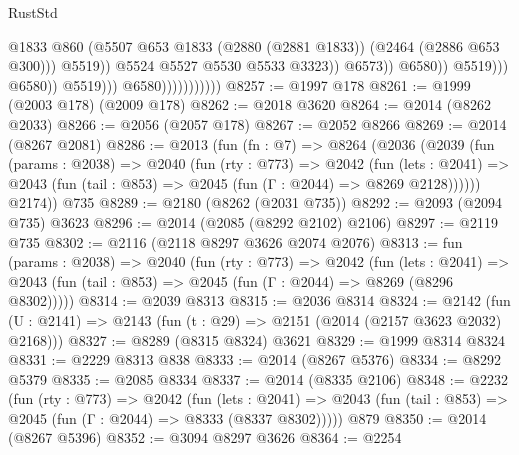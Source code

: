 \begin{lexlean}{RustStd}
\begin{coremodule}
                                                          @1833
                                                          @860
                                                          (@5507
                                                            @653
                                                            @1833
                                                            (@2880 (@2881 @1833))
                                                            (@2464 (@2886 @653 @300)))
                                                          @5519))
                                                      @5524
                                                      @5527
                                                      @5530
                                                      @5533
                                                      @3323))
                                                  @6573))
                                              @6580))
                                          @5519)))
                                    @6580))
                                @5519)))
                          @6580)))))))))))
@8257 := @1997 @178
@8261 := @1999 (@2003 @178) (@2009 @178)
@8262 := @2018 @3620
@8264 := @2014 (@8262 @2033)
@8266 := @2056 (@2057 @178)
@8267 := @2052 @8266
@8269 := @2014 (@8267 @2081)
@8286 := @2013
    (fun (fn : @7) =>
    @8264
      (@2036
        (@2039
          (fun (params : @2038) =>
          @2040
            (fun (rty : @773) =>
            @2042
              (fun (lets : @2041) =>
              @2043 (fun (tail : @853) => @2045 (fun (Γ : @2044) => @8269 @2128))))))
        @2174))
    @735
@8289 := @2180 (@8262 (@2031 @735))
@8292 := @2093 (@2094 @735) @3623
@8296 := @2014 (@2085 (@8292 @2102) @2106)
@8297 := @2119 @735
@8302 := @2116 (@2118 @8297 @3626 @2074 @2076)
@8313 := fun (params : @2038) =>
  @2040
    (fun (rty : @773) =>
    @2042
      (fun (lets : @2041) =>
      @2043 (fun (tail : @853) => @2045 (fun (Γ : @2044) => @8269 (@8296 @8302)))))
@8314 := @2039 @8313
@8315 := @2036 @8314
@8324 := @2142 (fun (U : @2141) => @2143 (fun (t : @29) => @2151 (@2014 (@2157 @3623 @2032) @2168)))
@8327 := @8289 (@8315 @8324) @3621
@8329 := @1999 @8314 @8324
@8331 := @2229 @8313 @838
@8333 := @2014 (@8267 @5376)
@8334 := @8292 @5379
@8335 := @2085 @8334
@8337 := @2014 (@8335 @2106)
@8348 := @2232
    (fun (rty : @773) =>
    @2042
      (fun (lets : @2041) =>
      @2043 (fun (tail : @853) => @2045 (fun (Γ : @2044) => @8333 (@8337 @8302)))))
    @879
@8350 := @2014 (@8267 @5396)
@8352 := @3094 @8297 @3626
@8364 := @2254

\end{coremodule}
\end{lexlean}
